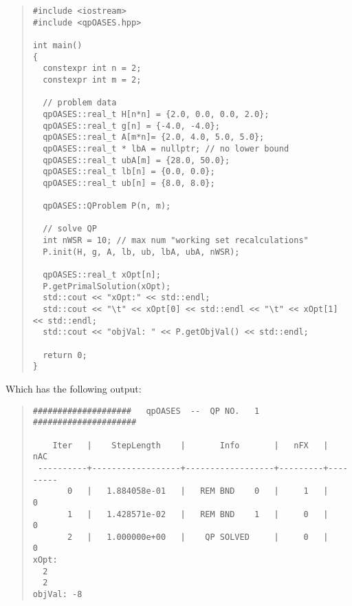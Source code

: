 \documentclass[10pt]{article}
\begin{document}
\begin{quote}
\begin{verbatim}
#include <iostream>
#include <qpOASES.hpp>

int main()
{
  constexpr int n = 2;
  constexpr int m = 2;

  // problem data
  qpOASES::real_t H[n*n] = {2.0, 0.0, 0.0, 2.0};
  qpOASES::real_t g[n] = {-4.0, -4.0};
  qpOASES::real_t A[m*n]= {2.0, 4.0, 5.0, 5.0};
  qpOASES::real_t * lbA = nullptr; // no lower bound
  qpOASES::real_t ubA[m] = {28.0, 50.0};
  qpOASES::real_t lb[n] = {0.0, 0.0};
  qpOASES::real_t ub[n] = {8.0, 8.0};

  qpOASES::QProblem P(n, m);

  // solve QP
  int nWSR = 10; // max num "working set recalculations"
  P.init(H, g, A, lb, ub, lbA, ubA, nWSR);

  qpOASES::real_t xOpt[n];
  P.getPrimalSolution(xOpt);
  std::cout << "xOpt:" << std::endl;
  std::cout << "\t" << xOpt[0] << std::endl << "\t" << xOpt[1] << std::endl;
  std::cout << "objVal: " << P.getObjVal() << std::endl;

  return 0;
}
\end{verbatim}
\end{quote}
Which has the following output:
\begin{quote}
\begin{verbatim}
####################   qpOASES  --  QP NO.   1   #####################

    Iter   |    StepLength    |       Info       |   nFX   |   nAC    
 ----------+------------------+------------------+---------+--------- 
       0   |   1.884058e-01   |   REM BND    0   |     1   |     0   
       1   |   1.428571e-02   |   REM BND    1   |     0   |     0   
       2   |   1.000000e+00   |    QP SOLVED     |     0   |     0   
xOpt:
  2
  2
objVal: -8
\end{verbatim}
\end{quote}
\end{document}
